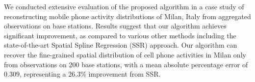 

We conducted extensive evaluation of the proposed algorithm in a case study of reconstructing mobile phone activity distributions of Milan, Italy from aggregated observations on base stations.
Results suggest that our algorithm achieves significant improvement, as compared to various other methods including the state-of-the-art Spatial Spline Regression (SSR) \cite{Sanga13} approach. 
Our algorithm can recover the fine-grained spatial distribution of cell phone activities in Milan only from observations on $200$ base stations, with a mean absolute percentage error of $0.309$, representing a $26.3\%$ improvement from SSR.













